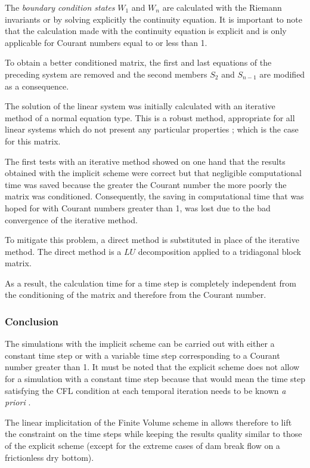 The \textit{boundary condition states} $W_1$ and $W_n$ are calculated with the Riemann invariants or by solving explicitly the continuity equation. It is important to note that the calculation made with the continuity equation is explicit and is only applicable for Courant numbers equal to or less than 1.

To obtain a better conditioned matrix, the first and last equations of the preceding system are removed and the second members $S_2$ and $S_{n-1}$ are modified as a consequence.

The solution of the linear system was initially calculated with an iterative method of a normal equation type. This is a robust method, appropriate for all linear systems which do not present any particular properties ; which is the case for this matrix.

The first tests with an iterative method showed on one hand that the results obtained with the implicit scheme were correct but that negligible computational time was saved because the greater the Courant number the more poorly the matrix was conditioned. Consequently, the saving in computational time that was hoped for with Courant numbers greater than 1, was lost due to the bad convergence of the iterative method.

To mitigate this problem, a direct method is substituted in place of the iterative method. The direct method is a $LU$ decomposition applied to a tridiagonal block matrix.

As a result, the calculation time for a time step is completely independent from the conditioning of the matrix and therefore from the Courant number.

\subsubsection{Conclusion}

The simulations with the implicit scheme can be carried out with either a constant time step or with a variable time step corresponding to a Courant number greater than 1. It must be noted that the explicit scheme does not allow for a simulation with a constant time step because that would mean the time step satisfying the CFL condition at each temporal iteration needs to be known \textit{a priori} .

The linear implicitation of the Finite Volume scheme in \mascaret{} allows therefore to lift the constraint on the time steps while keeping the results quality similar to those of the explicit scheme (except for the extreme cases of dam break flow on a frictionless dry bottom).


